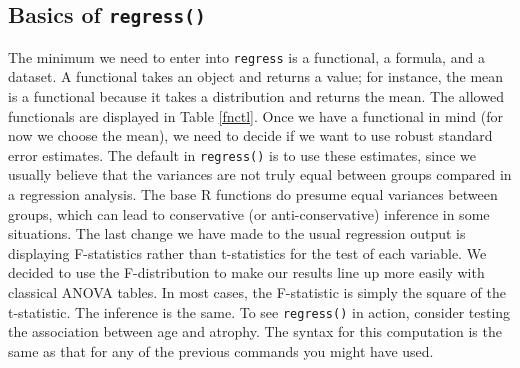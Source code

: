 \documentclass[landscape]{article}
\begin{document}
\subsection{Basics of \texttt{regress()}}
The minimum we need to enter into \texttt{regress} is a functional, a formula, and a dataset. A functional takes an object and returns a value; for instance, the mean is a functional because it takes a distribution and returns the mean. The allowed functionals are displayed in Table \ref{fnctl}. Once we have a functional in mind (for now we choose the mean), we need to decide if we want to use robust standard error estimates. The default in \texttt{regress()} is to use these estimates, since we usually believe that the variances are not truly equal between groups compared in a regression analysis. The base R functions do presume equal variances between groups, which can lead to conservative (or anti-conservative) inference in some situations. The last change we have made to the usual regression output is displaying F-statistics rather than t-statistics for the test of each variable. We decided to use the F-distribution to make our results line up more easily with classical ANOVA tables. In most cases, the F-statistic is simply the square of the t-statistic. The inference is the same. To see \texttt{regress()} in action, consider testing the association between age and atrophy. The syntax for this computation is the same as that for any of the previous commands you might have used. 
\end{document}
